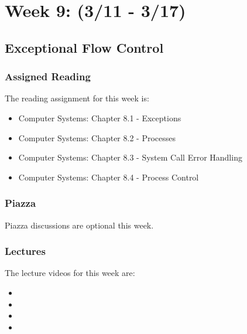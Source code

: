 \clearpage

\renewcommand{\ChapTitle}{Week 9: (3/11 - 3/17)}
\renewcommand{\SectionTitle}{Exceptional Flow Control}

\chapter{\ChapTitle}

\section{\SectionTitle}

\subsection{Assigned Reading}

The reading assignment for this week is:

\begin{itemize}
    \item Computer Systems: Chapter 8.1 - Exceptions
    \item Computer Systems: Chapter 8.2 - Processes
    \item Computer Systems: Chapter 8.3 - System Call Error Handling
    \item Computer Systems: Chapter 8.4 - Process Control
\end{itemize}

\subsection{Piazza}

Piazza discussions are optional this week. 

\subsection{Lectures}

The lecture videos for this week are:

\begin{itemize}
    \item {}
    \item {}
    \item {}
    \item {}
\end{itemize}

